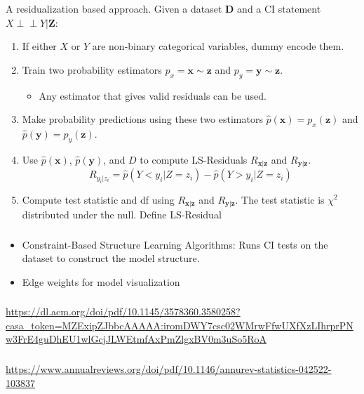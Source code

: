 \documentclass{beamer}
\def\ci{\perp\!\!\!\!\!\perp}
\begin{document}
\begin{frame}
	\frametitle{}
	A residualization based approach. Given a dataset $ \mathbf{D} $ and a CI statement $ X \ci Y | \bm{Z} $:
	\begin{enumerate}
		\item If either $ X $ or $ Y $ are non-binary categorical variables,
			dummy encode them.
		\item Train two probability estimators $ p_x = \bm{x} \sim \bm{z} $ and
			$ p_y = \bm{y} \sim \bm{z} $.
			\begin{itemize}
				\item Any estimator that gives valid residuals can be used.
			\end{itemize}
		\item Make probability predictions using these two estimators 
			$ \hat{p}(\bm{x}) = p_x(\bm{z}) $ and $ \hat{p}(\bm{y}) = p_y(\bm{\bm{z}}) $.
		\item Use $ \hat{p}(\bm{x}) $, $ \hat{p}(\bm{y}) $, and $ D $ to compute LS-Residuals $ R_{\bm{x}|\bm{z}} $ and $ R_{\bm{y}|\bm{z}} $.	
			$$ R_{y_i | z_i} = \hat{p}(Y < y_i | Z=z_i) - \hat{p}(Y>y_i|Z=z_i) $$
		\item Compute test statistic and df using $ R_{\bm{x}|\bm{z}} $ and $ R_{\bm{y}|\bm{z}} $. The test statistic is $ \chi^2 $ distributed under the null.
			Define LS-Residual
	\end{enumerate}
\end{frame}

\begin{frame}
	\frametitle{}
	\begin{itemize}
		\item Constraint-Based Structure Learning Algorithms: Runs CI tests on the dataset to construct the model structure.
		\item Edge weights for model visualization
	\end{itemize}
\end{frame}

\begin{frame}
	\frametitle{}
\end{frame}

\begin{frame}
	\frametitle{}
\end{frame}

\begin{frame}
	\frametitle{}
	\url{https://dl.acm.org/doi/pdf/10.1145/3578360.3580258?casa_token=MZExipZJbbcAAAAA:iromDWY7csc02WMrwFfwUXfXzLIhrprPNw3FrE4guDhEU1wlGcjJLWEtmfAxPmZlgxBV0m3uSo5RoA}
	
\end{frame}

\begin{frame}
	\frametitle{}
	\url{https://www.annualreviews.org/doi/pdf/10.1146/annurev-statistics-042522-103837}
\end{frame}
\end{document}
